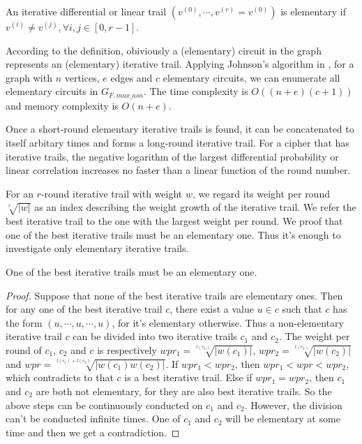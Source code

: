 \begin{definition}
    An iterative differential or linear trail $(v^{(0)},\cdots,v^{(r)}=v^{(0)})$ is elementary if $v^{(i)}\neq v^{(j)},\forall i,j\in [0,r-1]$.
\end{definition}

According to the definition, obiviously a (elementary) circuit in the graph represents an (elementary) iterative trail. Applying Johnson's algorithm in \cite{J75}, for a graph with $n$ vertices, $e$ edges and $c$ elementary circuits, we can enumerate all elementary circuits in $G_{F,max\_asn}$. The time complexity is $O((n + e)(c + 1))$ and memory complexity is $O(n + e)$.

Once a short-round elementary iterative trails is found, it can be concatenated to itself arbitary times and forms a long-round iterative trail. For a cipher that has iterative trails, the negative logarithm of the largest differential probability or linear correlation increases no faster than a linear function of the round number. 

For an $r$-round iterative trail with weight $w$, we regard its weight per round $\sqrt[r]{|w|}$ as an index describing the weight growth of the iterative trail. We refer the best iterative trail to the one with the largest weight per round. We proof that one of the best iterative trails must be an elementary one. Thus it's enough to investigate only elementary iterative trails. 

\begin{theorem}
	One of the best iterative trails must be an elementary one.
\end{theorem}

\begin{proof}
	Suppose that none of the best iterative trails are elementary ones. Then for any one of the best iterative trail $c$, there exist a value $u\in c$ such that $c$ has the form $(u,\cdots,u,\cdots,u)$, for it's elementary otherwise. Thus a non-elementary iterative trail $c$ can be divided into two iterative trails $c_1$ and $c_2$. The weight per round of $c_1$, $c_2$ and $c$ is respectively $wpr_1=\sqrt[l(c_1)]{|w(c_1)|}$, $wpr_2=\sqrt[l(c_2)]{|w(c_2)|}$ and $wpr=\sqrt[l(c_1)+l(c_2)]{|w(c_1)w(c_2)|}$. If $wpr_1< wpr_2$, then $wpr_1<wpr<wpr_2$, which contradicts to that $c$ is a best iterative trail. Else if $wpr_1=wpr_2$, then $c_1$ and $c_2$ are both not elementary, for they are also best iterative trails. So the above steps can be continuously conducted on $c_1$ and $c_2$. However, the division can't be conducted infinite times. One of $c_1$ and $c_2$ will be elementary at some time and then we get a contradiction. 
\end{proof}

